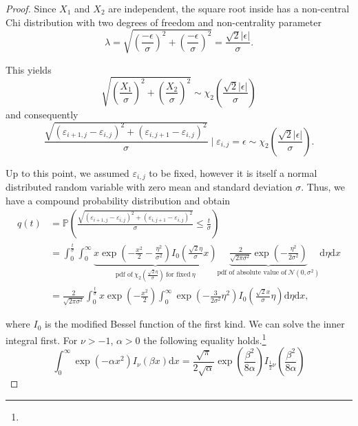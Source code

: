 \documentclass[a4paper,12pt]{article}
\newcommand{\abs}[1]{\lvert#1\rvert}
\theoremstyle{plain}
\theoremstyle{definition}
\begin{document}
\begin{proof}
	Since $X_1$ and $X_2$ are independent, the square root inside has a non-central Chi distribution with two degrees of freedom and non-centrality parameter
	\begin{equation*}
		\lambda = \sqrt{\left( \frac{- \epsilon}{\sigma} \right)^2 + \left( \frac{- \epsilon}{\sigma} \right)^2} = \frac{\sqrt{2} \abs{\epsilon}}{\sigma}.
	\end{equation*}
	
	This yields
	\begin{equation*}
		\sqrt{\left( \frac{X_1}{\sigma} \right)^2 + \left( \frac{X_2}{\sigma} \right)^2} \sim \chi_2 \left( \frac{\sqrt{2} \abs{\epsilon}}{\sigma} \right)
	\end{equation*}
	and consequently
	\begin{equation*}
		\frac{\sqrt{(\varepsilon_{i + 1, j} - \varepsilon_{i, j})^2 + (\varepsilon_{i, j + 1} - \varepsilon_{i, j})^2}}{\sigma} \mid \varepsilon_{i, j} = \epsilon \sim \chi_2 \left( \frac{\sqrt{2} \abs{\epsilon}}{\sigma} \right).
	\end{equation*}
	
	Up to this point, we assumed $\varepsilon_{i, j}$ to be fixed, however it is itself a normal distributed random variable with zero mean and standard deviation $\sigma$. Thus, we have a compound probability distribution and obtain
	\begin{align*}
		q(t) &= \mathbb{P}\left( \frac{\sqrt{(\varepsilon_{i + 1, j} - \varepsilon_{i, j})^2 + (\varepsilon_{i, j + 1} - \varepsilon_{i, j})^2}}{\sigma} \leq \frac{t}{\sigma} \right) \\
		&= \int_0^\frac{t}{\sigma} \int_0^\infty \underbrace{x \exp \left( - \frac{x^2}{2} - \frac{\eta^2}{\sigma^2} \right) I_0 \left( \frac{\sqrt{2} \eta}{\sigma} x \right)}_{\textrm{pdf of} \ \chi_2 \left( \frac{\sqrt{2} \eta}{\sigma} \right) \ \textrm{for fixed} \ \eta} \underbrace{\frac{2}{\sqrt{2 \pi \sigma^2}} \exp \left( - \frac{\eta^2}{2 \sigma^2} \right)}_{\textrm{pdf of absolute value of} \ \mathcal{N}(0, \sigma^2)} \mathrm{d}\eta \mathrm{d}x \\
		&= \frac{2}{\sqrt{2 \pi \sigma^2}} \int_0^\frac{t}{\sigma} x \exp \left( - \frac{x^2}{2} \right) \int_0^\infty \exp \left( - \frac{3}{2 \sigma^2} \eta^2 \right) I_0 \left( \frac{\sqrt{2} x}{\sigma} \eta \right) \mathrm{d}\eta \mathrm{d}x,
	\end{align*}
	
	where $I_0$ is the modified Bessel function of the first kind. We can solve the inner integral first. For $\nu > -1$, $\alpha > 0$ the following equality holds.\footnote{}
	\begin{equation}\label{eq: intbessel}
		\int_0^\infty \exp \left( - \alpha x^2 \right) I_\nu ( \beta x ) \mathrm{d}x = \frac{\sqrt{\pi}}{2 \sqrt{\alpha}} \exp \left( \frac{\beta^2}{8 \alpha} \right) I_{\frac{1}{2} \nu} \left( \frac{\beta^2}{8 \alpha} \right)
	\end{equation}
	

\end{proof}
\end{document}
